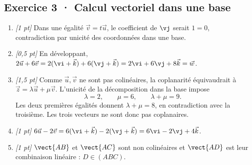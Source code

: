 \subsection*{Exercice 3 · Calcul vectoriel dans une base}\begin{enumerate}

\item \textit{[1 pt]} Dans une égalité $\vec v=t\vec u$, le coefficient de $\vj $ serait $1=0$, contradiction par unicité des coordonnées dans une base.

\item \textit{[0,5 pt]} En développant, $2\vec u+6\vec v=2(\vi +\vec k)+6(\vj +\vec k)=2\vi +6\vj +8\vec k=\vec w$.

\item \textit{[1,5 pt]} Comme $\vec u,\vec v$ ne sont pas colinéaires, la coplanarité équivaudrait à $\vec z=\lambda\vec u+\mu\vec v$. L'unicité de la décomposition dans la base impose
\[\lambda=2,\qquad\mu=6,\qquad\lambda+\mu=9.\]
Les deux premières égalités donnent $\lambda+\mu=8$, en contradiction avec la troisième. Les trois vecteurs ne sont donc pas coplanaires.

\item \textit{[1 pt]} $6\vec u-2\vec v=6(\vi +\vec k)-2(\vj +\vec k)=6\vi -2\vj +4\vec k$.

\item \textit{[1 pt]} $\vect{AB}$ et $\vect{AC}$ sont non colinéaires et $\vect{AD}$ est leur combinaison linéaire : $D\in(ABC)$.

\end{enumerate}

